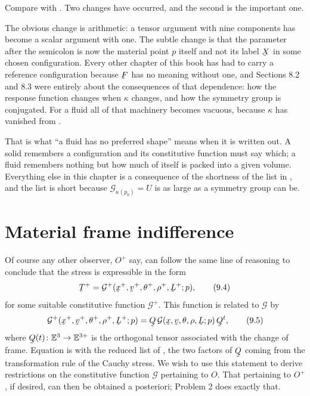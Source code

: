 \begin{remark}\label{rem:ch9nokappa}
Compare  with . Two changes have occurred, and the
second is the important one.

The obvious change is arithmetic: a tensor argument with nine components
has become a scalar argument with one. The subtle change is that the
parameter after the semicolon is now the material point $p$ itself and
not its label $\bX$ in some chosen configuration. Every other chapter of
this book has had to carry a reference configuration because $\bF$ has
no meaning without one, and Sections 8.2 and 8.3 were entirely about the
consequences of that dependence: how the response function changes when
$\kappa$ changes, and how the symmetry group is conjugated. For a fluid
all of that machinery becomes vacuous, because $\kappa$ has vanished
from .

That is what ``a fluid has no preferred shape'' means when it is written
out. A solid remembers a configuration and its constitutive function
must say which; a fluid remembers nothing but how much of itself is
packed into a given volume. Everything else in this chapter is a
consequence of the shortness of the list in , and the list is
short because $\mathcal{G}_{\kappa(p_{0})}=U$ is as large as a symmetry
group can be.
\end{remark}

\section{Material frame indifference}\label{sec:ch9mfi}

Of course any other observer, $O^{+}$ say, can follow the same line of
reasoning to conclude that the stress is expressible in the form
\begin{equation}
   \bT^{+}=\mathcal{G}^{+}(\bx^{+},\bv^{+},\theta^{+},\rho^{+},\bL^{+};p),
   \tag{9.4}\label{eq:9.4}
\end{equation}
for some suitable constitutive function $\mathcal{G}^{+}$. This function
is related to $\mathcal{G}$ by
\begin{equation}
   \mathcal{G}^{+}(\bx^{+},\bv^{+},\theta^{+},\rho^{+},\bL^{+};p)
   =\bQ\,\mathcal{G}(\bx,\bv,\theta,\rho,\bL;p)\,\bQ^{t},
   \tag{9.5}\label{eq:9.5}
\end{equation}
where $\bQ(t)\colon\Vt\to\mathbb{E}^{3+}$ is the orthogonal tensor
associated with the change of frame. Equation  is 
with the reduced list of , the two factors of $\bQ$ coming from
the transformation rule  of the Cauchy stress. We wish to use
this statement to derive restrictions on the constitutive function
$\mathcal{G}$ pertaining to $O$. That pertaining to $O^{+}$, if desired,
can then be obtained a posteriori; Problem 2 does exactly that.

